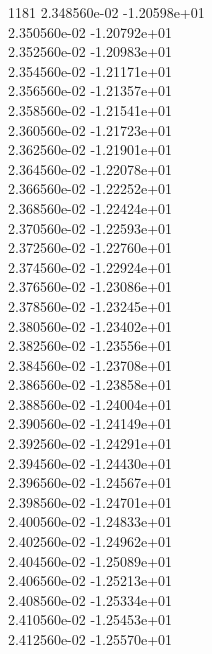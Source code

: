 1181	2.348560e-02	-1.20598e+01	\\ 	2.350560e-02	-1.20792e+01	\\ 	2.352560e-02	-1.20983e+01	\\ 	2.354560e-02	-1.21171e+01	\\ 	2.356560e-02	-1.21357e+01	\\ 	2.358560e-02	-1.21541e+01	\\ 	2.360560e-02	-1.21723e+01	\\ 	2.362560e-02	-1.21901e+01	\\ 	2.364560e-02	-1.22078e+01	\\ 	2.366560e-02	-1.22252e+01	\\ 	2.368560e-02	-1.22424e+01	\\ 	2.370560e-02	-1.22593e+01	\\ 	2.372560e-02	-1.22760e+01	\\ 	2.374560e-02	-1.22924e+01	\\ 	2.376560e-02	-1.23086e+01	\\ 	2.378560e-02	-1.23245e+01	\\ 	2.380560e-02	-1.23402e+01	\\ 	2.382560e-02	-1.23556e+01	\\ 	2.384560e-02	-1.23708e+01	\\ 	2.386560e-02	-1.23858e+01	\\ 	2.388560e-02	-1.24004e+01	\\ 	2.390560e-02	-1.24149e+01	\\ 	2.392560e-02	-1.24291e+01	\\ 	2.394560e-02	-1.24430e+01	\\ 	2.396560e-02	-1.24567e+01	\\ 	2.398560e-02	-1.24701e+01	\\ 	2.400560e-02	-1.24833e+01	\\ 	2.402560e-02	-1.24962e+01	\\ 	2.404560e-02	-1.25089e+01	\\ 	2.406560e-02	-1.25213e+01	\\ 	2.408560e-02	-1.25334e+01	\\ 	2.410560e-02	-1.25453e+01	\\ 	2.412560e-02	-1.25570e+01	\\ \hline
